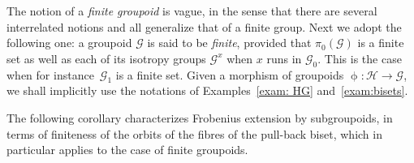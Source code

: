 \documentclass[10pt,a4paper]{amsart}
\numberwithin{equation}{section}
\newcommand{\Go}{\cG_{\Sscript{0}}}
\newcommand{\Ga}{\cG_{\Sscript{1}}}
\newcommand{\cG}{{\mathcal G}}
\newcommand{\cH}{{\mathcal H}}
\newcommand{\Sscript}[1]{\scriptscriptstyle{#1}}
\begin{document}
\smallskip

The notion of a \emph{finite groupoid} is vague, in the sense that there are several interrelated notions and all generalize that of a finite group. Next we adopt the following one: a groupoid $\cG$ is said to be \emph{finite}, provided that $\pi_{0}(\cG)$ is a finite set as well as each of its isotropy groups $\cG^{\Sscript{x}}$ when $x$ runs in $\Go$. This is the case when for instance~$\Ga$ is a finite set. Given a morphism of groupoids $\upphi\colon \cH \to \cG$, we shall implicitly use the notations of Examples~\ref{exam: HG} and~\ref{exam:bisets}.

The following corollary characterizes Frobenius extension by subgroupoids, in terms of finiteness of the orbits of the fibres of the pull-back biset, which in particular applies to the case of
finite groupoids.
\end{document}
